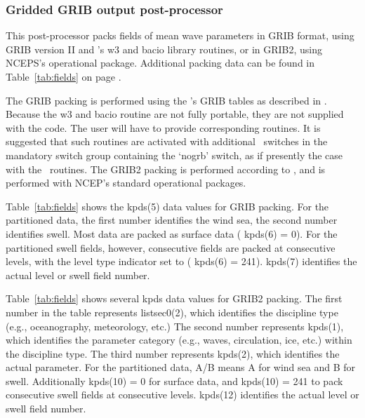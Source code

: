 \vsssub
\subsubsection{Gridded GRIB output post-processor} \label{sec:ww3grib}
\vsssub



\vspace{\baselineskip} 
\noindent
This post-processor packs fields of mean wave parameters in GRIB format, using
GRIB version II and \ncep's w3 and bacio library routines, or in GRIB2, using
NCEPS's operational package. Additional packing data can be found in
Table~\ref{tab:fields} on page \pageref{tab:fields}.

The GRIB packing is performed using the \ncep's GRIB tables as described in
\cite{rep:GRIB1}. Because the w3 and bacio routine are not fully portable, they
are not supplied with the code. The user will have to provide corresponding
routines. It is suggested that such routines are activated with additional
\ws\ switches in the mandatory switch group containing the `{\F nogrb}'
switch, as if presently the case with the \ncep\ routines.  The GRIB2 packing
is performed according to \cite{rep:GRIB2}, and is performed with NCEP's
standard operational packages.

Table~\ref{tab:fields} shows the {\F kpds(5)} data values for GRIB
packing. For the partitioned data, the first number identifies the wind sea,
the second number identifies swell. Most data are packed as surface data ({\F
kpds(6) = 0}). For the partitioned swell fields, however, consecutive fields
are packed at consecutive levels, with the level type indicator set to ({\F
kpds(6) = 241}). {\F kpds(7)} identifies the actual level or swell field
number.

Table~\ref{tab:fields} shows several {\F kpds} data values for GRIB2
packing. The first number in the table represents {\F listsec0(2)}, which
identifies the discipline type (e.g., oceanography, meteorology, etc.)  The
second number represents {\F kpds(1)}, which identifies the parameter category
(e.g., waves, circulation, ice, etc.) within the discipline type.  The third
number represents {\F kpds(2)}, which identifies the actual parameter.  For
the partitioned data, A/B means A for wind sea and B for swell.  Additionally
{\F kpds(10) = 0} for surface data, and {\F kpds(10) = 241 } to pack
consecutive swell fields at consecutive levels. {\F kpds(12)} identifies the
actual level or swell field number.

